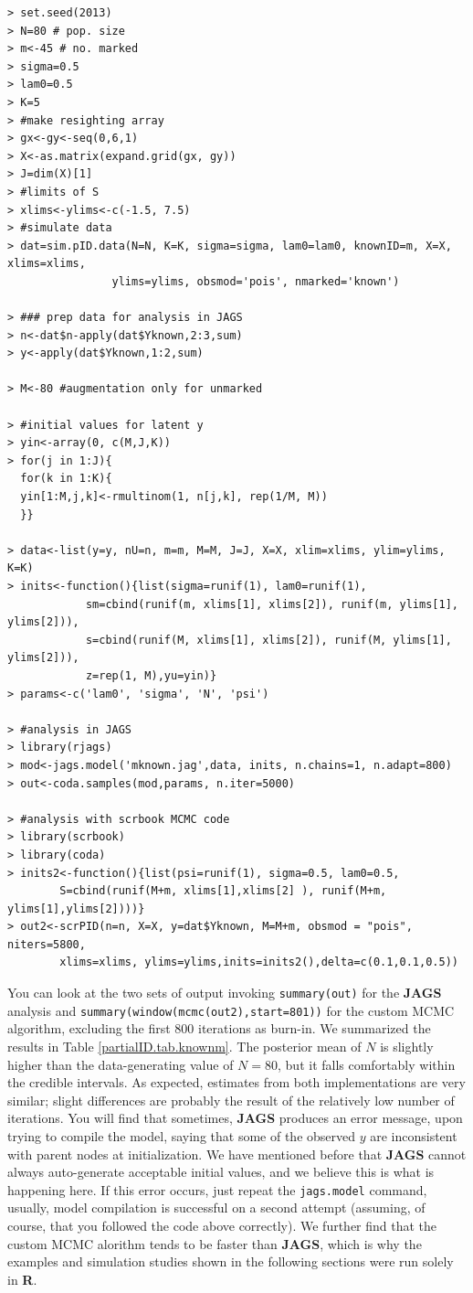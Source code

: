 {\small
\begin{verbatim}
> set.seed(2013)
> N=80 # pop. size
> m<-45 # no. marked
> sigma=0.5
> lam0=0.5
> K=5
> #make resighting array
> gx<-gy<-seq(0,6,1)
> X<-as.matrix(expand.grid(gx, gy))
> J=dim(X)[1]
> #limits of S
> xlims<-ylims<-c(-1.5, 7.5)
> #simulate data
> dat=sim.pID.data(N=N, K=K, sigma=sigma, lam0=lam0, knownID=m, X=X, xlims=xlims,
				ylims=ylims, obsmod='pois',	nmarked='known')

> ### prep data for analysis in JAGS
> n<-dat$n-apply(dat$Yknown,2:3,sum)
> y<-apply(dat$Yknown,1:2,sum)

> M<-80 #augmentation only for unmarked

> #initial values for latent y
> yin<-array(0, c(M,J,K))
> for(j in 1:J){
  for(k in 1:K){
  yin[1:M,j,k]<-rmultinom(1, n[j,k], rep(1/M, M))
  }}

> data<-list(y=y, nU=n, m=m, M=M, J=J, X=X, xlim=xlims, ylim=ylims, K=K)
> inits<-function(){list(sigma=runif(1), lam0=runif(1),
			sm=cbind(runif(m, xlims[1], xlims[2]), runif(m, ylims[1], ylims[2])),
			s=cbind(runif(M, xlims[1], xlims[2]), runif(M, ylims[1], ylims[2])),
			z=rep(1, M),yu=yin)}
> params<-c('lam0', 'sigma', 'N', 'psi')

> #analysis in JAGS
> library(rjags)
> mod<-jags.model('mknown.jag',data, inits, n.chains=1, n.adapt=800)
> out<-coda.samples(mod,params, n.iter=5000)

> #analysis with scrbook MCMC code
> library(scrbook)
> library(coda)
> inits2<-function(){list(psi=runif(1), sigma=0.5, lam0=0.5,
		S=cbind(runif(M+m, xlims[1],xlims[2] ), runif(M+m, ylims[1],ylims[2])))}
> out2<-scrPID(n=n, X=X, y=dat$Yknown, M=M+m, obsmod = "pois", niters=5800,
		xlims=xlims, ylims=ylims,inits=inits2(),delta=c(0.1,0.1,0.5))
\end{verbatim}
}
You can look at the two sets of output invoking {\tt summary(out)} for the {\bf JAGS} analysis and {\tt summary(window(mcmc(out2),start=801))} for the custom MCMC algorithm, excluding the first 800 iterations as burn-in. 
We summarized the results in Table \ref{partialID.tab.knownm}.
The posterior mean of $N$ is slightly higher than the data-generating value of $N=80$, but it falls comfortably within the credible intervals. 
As expected, estimates from both implementations are very similar; slight differences are probably the result of the relatively low number of iterations.
You will find that sometimes, {\bf JAGS} produces an error message, upon trying to compile the model, saying that some of the observed $y$ are inconsistent with parent nodes at initialization. We have mentioned before that  {\bf JAGS} cannot always auto-generate acceptable 
initial values, and we believe this is what is happening here. If this error occurs, just repeat the {\tt jags.model} command, usually, model compilation is successful on a second attempt (assuming, of course, that you followed the code above correctly). We further find that the custom MCMC alorithm tends to be faster than {\bf JAGS}, which is why the examples and simulation studies shown in the following sections were run solely in {\bf R}.

